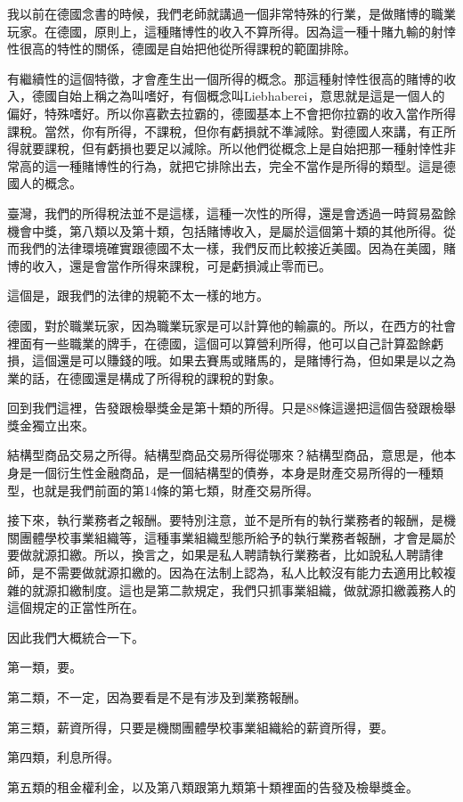 \documentclass[oneside,sub3section]{ctexbook}
\begin{document}
我以前在德國念書的時候，我們老師就講過一個非常特殊的行業，是做賭博的職業玩家。在德國，原則上，這種賭博性的收入不算所得。因為這一種十賭九輸的射悻性很高的特性的關係，德國是自始把他從所得課稅的範圍排除。

有繼續性的這個特徵，才會產生出一個所得的概念。那這種射悻性很高的賭博的收入，德國自始上稱之為叫嗜好，有個概念叫Liebhaberei，意思就是這是一個人的偏好，特殊嗜好。所以你喜歡去拉霸的，德國基本上不會把你拉霸的收入當作所得課稅。當然，你有所得，不課稅，但你有虧損就不準減除。對德國人來講，有正所得就要課稅，但有虧損也要足以減除。所以他們從概念上是自始把那一種射悻性非常高的這一種賭博性的行為，就把它排除出去，完全不當作是所得的類型。這是德國人的概念。

臺灣，我們的所得稅法並不是這樣，這種一次性的所得，還是會透過一時貿易盈餘機會中獎，第八類以及第十類，包括賭博收入，是屬於這個第十類的其他所得。從而我們的法律環境確實跟德國不太一樣，我們反而比較接近美國。因為在美國，賭博的收入，還是會當作所得來課稅，可是虧損減止零而已。

這個是，跟我們的法律的規範不太一樣的地方。

德國，對於職業玩家，因為職業玩家是可以計算他的輸贏的。所以，在西方的社會裡面有一些職業的牌手，在德國，這個可以算營利所得，他可以自己計算盈餘虧損，這個還是可以賺錢的哦。如果去賽馬或賭馬的，是賭博行為，但如果是以之為業的話，在德國還是構成了所得稅的課稅的對象。

回到我們這裡，告發跟檢舉獎金是第十類的所得。只是88條這邊把這個告發跟檢舉獎金獨立出來。

結構型商品交易之所得。結構型商品交易所得從哪來？結構型商品，意思是，他本身是一個衍生性金融商品，是一個結構型的債券，本身是財產交易所得的一種類型，也就是我們前面的第14條的第七類，財產交易所得。

接下來，執行業務者之報酬。要特別注意，並不是所有的執行業務者的報酬，是機關團體學校事業組織等，這種事業組織型態所給予的執行業務者報酬，才會是屬於要做就源扣繳。所以，換言之，如果是私人聘請執行業務者，比如說私人聘請律師，是不需要做就源扣繳的。因為在法制上認為，私人比較沒有能力去適用比較複雜的就源扣繳制度。這也是第二款規定，我們只抓事業組織，做就源扣繳義務人的這個規定的正當性所在。

因此我們大概統合一下。

第一類，要。

第二類，不一定，因為要看是不是有涉及到業務報酬。

第三類，薪資所得，只要是機關團體學校事業組織給的薪資所得，要。

第四類，利息所得。

第五類的租金權利金，以及第八類跟第九類第十類裡面的告發及檢舉獎金。
\end{document}
